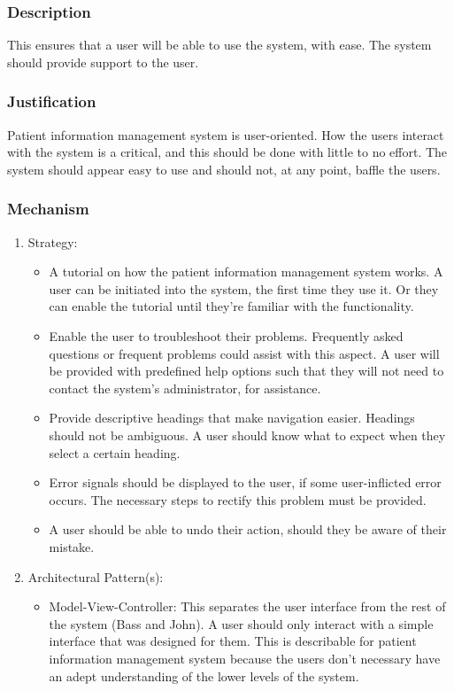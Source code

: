\subsubsection{Description}
This ensures that a user will be able to use the system, with ease. The system should provide support to the user.
\subsubsection{Justification}
Patient information management system is user-oriented. How the users interact with the system is a critical, and this should be done with little to no effort. The system should appear easy to use and should not, at any point, baffle the users. 
\subsubsection{Mechanism}
	\begin{enumerate}
		\item Strategy:
		
		 	\begin{itemize}
		 	\item A tutorial on how the patient information management system works. A user can be initiated into the system, the 					  first time they use it. Or they can enable the tutorial until they're familiar with the functionality.
		 	\item Enable the user to troubleshoot their problems. Frequently asked questions or frequent problems could assist 						with this aspect.  A user will be provided with predefined help options such that they will not need to contact 					the system's administrator, for assistance.
		 	\item Provide descriptive headings that make navigation easier. Headings should not be ambiguous. A user should 						  know what to expect when they select a certain heading.
		 	\item Error signals should be displayed to the user, if some user-inflicted error occurs. The necessary steps to 		                  rectify this problem must be provided.
		 	\item A user should be able to undo their action, should they be aware of their mistake.
		 	\end{itemize}
		 	
		\item Architectural Pattern(s):
		
			\begin{itemize}
			\item Model-View-Controller: This separates the user interface from the rest of the system (Bass and John). A user 		                  should only interact with a simple interface that was designed for them. This is describable for patient         					information management system because the users don't necessary have an adept understanding of the lower     		                levels of the system.
			\end{itemize}
	\end{enumerate}